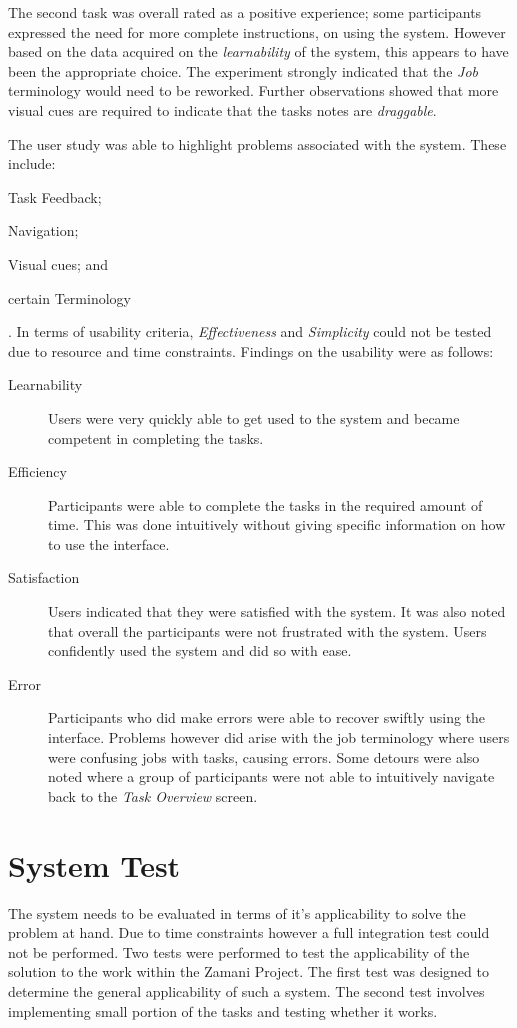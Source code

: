 \documentclass[12pt,a4paper]{report}
\begin{document}
\noindent The second task was overall rated as a positive experience; some participants
expressed the need for more complete instructions, on using
the system. However based on the data acquired on the \emph{learnability} of the
system, this appears to have been the appropriate choice. The experiment strongly
indicated that the \emph{Job} terminology would need to be reworked. Further
observations showed that more visual cues are required to indicate that the
tasks notes are \emph{draggable}.

The user study was able to highlight problems associated with the system. These
include: \begin{inparaenum}[(i)]\item Task Feedback; \item Navigation; \item
Visual cues; and \item certain Terminology\end{inparaenum}. In terms of
usability criteria, \emph{Effectiveness} and \emph{Simplicity} could not be
tested due to resource and time constraints. Findings on the usability were as
follows:

\begin{description}
\item[Learnability] Users were very quickly able to get used to the system and
	became competent in completing the tasks.
\item[Efficiency] Participants were able to complete the tasks in the required
	amount of time. This was done intuitively without giving specific
	information on how to use the interface.
\item[Satisfaction] Users indicated that they were satisfied with the system. It
	was also noted that overall the participants were not frustrated with
	the system. Users confidently used the system and did so with ease.
\item[Error] Participants who did make errors were able to recover swiftly
	using the interface. Problems however did arise with the job terminology
	where users were confusing jobs with tasks, causing errors. Some detours
	were also noted where a group of participants were not able to
	intuitively navigate back to the \emph{Task Overview} screen.
\end{description}



\section{System Test}
The system needs to be evaluated in terms of it's applicability to solve the
problem at hand. Due to time constraints however a full integration test could
not be performed. Two tests were performed to test the applicability of the
solution to the work within the Zamani Project. The first test was designed to
determine the general applicability of such a system. The second test involves
implementing small portion of the tasks and testing whether it works.
\end{document}
